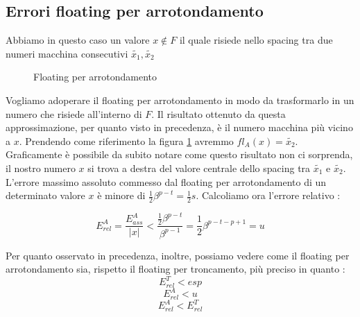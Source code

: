 \documentclass[12pt, a4paper]{book}
\theoremstyle{definition}
\begin{document}
\subsection{Errori floating per arrotondamento}
\begin{flushleft}
Abbiamo in questo caso un valore $x \notin F$  il quale risiede nello spacing tra due numeri macchina consecutivi $\widetilde{x_{1}},\widetilde{x_{2}}$


\begin{figure}[h!]
\centering
{}
\caption{Floating per arrotondamento}
\label{floating arrotondamento}
\end{figure}
Vogliamo adoperare il floating per arrotondamento in modo da trasformarlo in un numero che risiede all'interno di $F$. 
Il risultato ottenuto da questa approssimazione, per quanto visto in precedenza, è il numero macchina più vicino a $x$. 
Prendendo come riferimento la figura \ref{floating arrotondamento} avremmo $fl_{A}(x) = \widetilde{x_{2}}$.
Graficamente è possibile da subito notare come questo risultato non ci sorprenda, il nostro numero $x$ si trova a destra del valore centrale dello spacing tra $\widetilde{x_{1}}$ e $\widetilde{x_{2}}$.  L'errore massimo assoluto commesso dal floating per arrotondamento di un determinato valore $x$ è minore di $\frac{1}{2}\beta^{p-t} = \frac{1}{2}s$. 
Calcoliamo ora l'errore relativo : 

\[ E_{rel}^{A} = \frac{E_{ass}^{A}}{|x|} < \frac{\frac{1}{2}\beta^{p-t}}{\beta^{p-1}} = \frac{1}{2}\beta^{p-t-p+1} = u \]

Per quanto osservato in precedenza, inoltre, possiamo vedere come il floating per arrotondamento sia, rispetto il floating per 
troncamento,  più preciso in quanto : 
\[ E_{rel}^{T} < esp \]
\[ E_{rel}^{A} < u \]
\[ E_{rel}^{A} < E_{rel}^{T}  \]
\end{flushleft}
\end{document}
